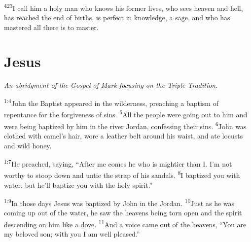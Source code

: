 \documentclass[openany,12pt,english]{book}
\newenvironment{para}{\par\pretolerance=100\tolerance=200\setlength{\emergencystretch}{0.6em}\relax}{\par}
\begin{document}
\begin{para}
    \textsuperscript{423}\thinspace{}I call him a ho\-ly man who knows his form\-er lives, who sees heav\-en and hell, has reached the end of births, is per\-fect in knowl\-edge, a sage, and who has mastered all there is to mas\-ter.
\end{para}

\chapter*{Jesus}
\begin{changemargin}{.6in}{.6in}
  \begin{center}
    \itshape
    An a\-bridg\-ment of the Gos\-pel of Mark fo\-cus\-ing on the Tri\-ple Tra\-di\-tion.
  \end{center}
\end{changemargin}
\begin{para}
    \textsuperscript{1:4}\thinspace{}John the Baptist appeared in the wil\-der\-ness, preaching a bap\-tism of re\-pent\-ance for the for\-give\-ness of sins.
    \textsuperscript{5}\thinspace{}All the peo\-ple were go\-ing out to him and were be\-ing bap\-tized by him in the riv\-er Jor\-dan, con\-fess\-ing their sins.
    \textsuperscript{6}\thinspace{}John was clothed with camel's hair, wore a leath\-er belt a\-round his waist, and ate locusts and wild hon\-ey.
\end{para}

\begin{para}
    \textsuperscript{1:7}\thinspace{}He preached, say\-ing, “Af\-ter me co\-mes he who is might\-i\-er than I. I'm not wor\-thy to stoop down and un\-tie the strap of his sandals.
    \textsuperscript{8}\thinspace{}I bap\-tized you with wa\-ter, but he'll bap\-tize you with the ho\-ly spir\-it.”
\end{para}

\bigskip{}

\begin{para}
    \textsuperscript{1:9}\thinspace{}In those days Jesus was bap\-tized by John in the Jor\-dan.
    \textsuperscript{10}\thinspace{}Just as he was com\-ing up out of the wa\-ter, he saw the heavens be\-ing torn o\-pen and the spir\-it descending on him like a dove.
    \textsuperscript{11}\thinspace{}And a voice came out of the heavens, “You are my be\-lov\-ed son; with you I am well pleased.”
\end{para}
\end{document}
